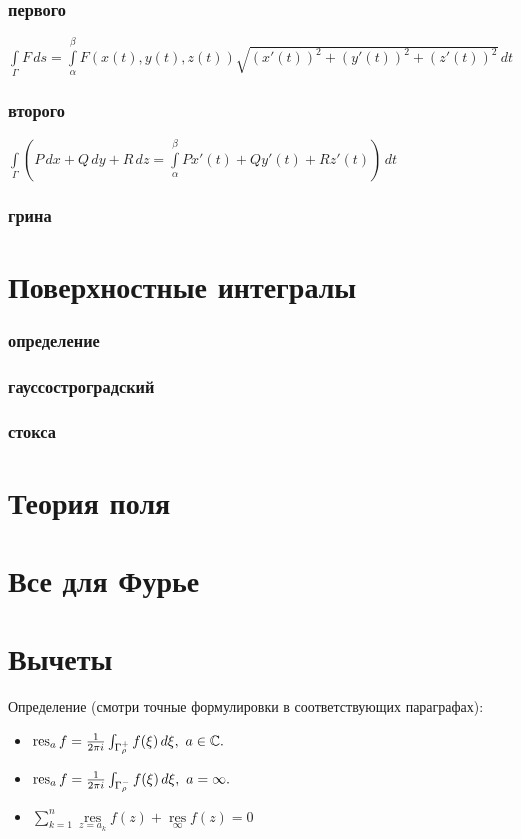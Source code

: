 \subsubsection{первого}
$\int\limits_{\Gamma} F\, ds = \int\limits_{\alpha}^{\beta} F(x(t),y(t),z(t))\sqrt{(x'(t))^2+(y'(t))^2+(z'(t))^2}\,dt$
\subsubsection{второго}
$\int\limits_{\Gamma} \left(P\,dx+Q\,dy+R\,dz=\int\limits_{\alpha}^{\beta} P x'(t)+ Q y'(t)+ R z'(t)\right)\,dt$
\subsubsection{грина}


\section{Поверхностные интегралы}
\subsubsection{определение}
\subsubsection{гауссостроградский}
\subsubsection{стокса}

\section{Теория поля}

\section{Все для Фурье}


\section{Вычеты}
\noindent Определение (смотри точные формулировки в соответствующих параграфах):
\begin{itemize}
\item
$\operatorname*{res}_a f=\frac{1}{2\pi i} \int_{\Gamma_{\rho}^{+}} f(\xi)\, d\xi,\ a\in\mathbb{C}.$
\item
$\operatorname*{res}_a f=\frac{1}{2\pi i} \int_{\Gamma_{\rho}^{-}} f(\xi)\, d\xi,\ a=\infty.$
\item
$\sum _{k=1}^{n}\mathop {\mathrm {res} } \limits _{z=a_{k}}f(z) + \mathop {\mathrm {res}} \limits _{\infty } f(z) = 0 $
\end{itemize}

